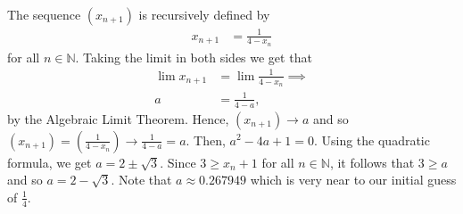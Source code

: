 \documentclass[12pt]{article}
\newcommand{\N}{\mathbb{N}}
\newenvironment{problem}[2][Problem]{\begin{trivlist} \item[\hskip \labelsep {\bfseries #1}\hskip \labelsep {\bfseries #2.}]}{\end{trivlist}}
\newenvironment{solution}[1][Solution]{\begin{trivlist} \item[\hskip \labelsep {\bfseries #1}]}{\end{trivlist}}
\begin{document}
\begin{problem}{2.4.1}
\begin{enumerate}
\begin{solution}
  The sequence $(x_{n+1})$ is recursively defined by 
\begin{align*}
  x_{n+1} &= \frac{1}{4-x_{n}}
\end{align*}
for all $n\in \N$. Taking the limit in both sides we get that
\begin{align*}
  \lim x_{n+1} &= \lim \frac{1}{4-x_{n}} \implies \\
  a &= \frac{1}{4-a},
\end{align*}
by the Algebraic Limit Theorem. Hence, $(x_{n+1})\to a$ and so $(x_{n+1})=\left( \frac{1}{4-x_{n}} \right) \to \frac{1}{4-a} = a$. Then, $a^{2}-4a+1=0$. Using the quadratic formula, we get $a=2\pm \sqrt{3}$. Since $3\geq x_{n}+1$ for all $n\in \N$, it follows that $3\geq a$ and so $a=2-\sqrt{3}$. Note that $a\approx 0.267949$ which is very near to our initial guess of $\frac{1}{4}$.
\end{solution}
\end{enumerate}
\end{problem}
\end{document}
